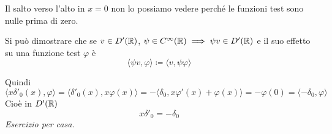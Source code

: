 Il salto verso l'alto in $x=0$ non lo possiamo vedere perché le funzioni test sono nulle prima di zero.
\Soluzione
\begin{rem}
Si può dimostrare che se $v\in D'(\mathbb{R} )$, $\psi \in C^{\infty }(\mathbb{R} ) \implies \psi v\in D'(\mathbb{R} )$ e il suo effetto su una funzione test $\varphi $ è
\begin{equation*}
\langle \psi v,\varphi \rangle \coloneqq \langle v,\psi \varphi \rangle 
\end{equation*}
\end{rem}
Quindi
\begin{equation*}
\langle x\delta '_{0} (x),\varphi \rangle =\langle \delta '_{0} (x),x\varphi ( x) \rangle =-\langle \delta _{0} ,x\varphi '( x) +\varphi ( x) \rangle =-\varphi ( 0) =\langle -\delta _{0} ,\varphi \rangle 
\end{equation*}
Cioè in $D'(\mathbb{R} )$
\begin{equation*}
x\delta '_{0} =-\delta _{0}
\end{equation*}
\textit{Esercizio per casa.}

